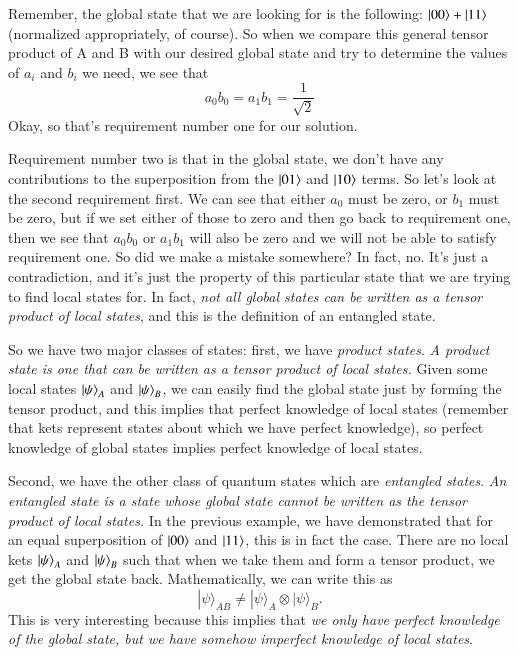 Remember, the global state that we are looking for is the following: $\ket{00}+\ket{11}$ (normalized appropriately, of course). 
So when we compare this general tensor product of A and B with our desired global state and try to determine the values of $a_i$ and $b_i$ we need, we see that
\begin{equation}
a_{0} b_{0}=a_{1} b_{1}=\frac{1}{\sqrt{2}}
\end{equation}
Okay, so that's requirement number one for our solution.

Requirement number two is that in the global state, we don't have any contributions to the superposition from the $\ket{01}$ and $\ket{10}$ terms. So let's look at the second requirement first. We can see that either $a_0$ must be zero, or $b_1$ must be zero, but if we set either of those to zero and then go back to requirement one, then we see that $a_0 b_0$ or $a_1 b_1$ will also be zero and we will not be able to satisfy requirement one.
So did we make a mistake somewhere? In fact, no. It's just a contradiction, and it's just the property of this particular state that we are trying to find local states for. In fact, \emph{not all global states can be written as a tensor product of local states}, and this is the definition of an entangled state.

So we have two major classes of states: first, we have \emph{product states}. %
\emph{A product state is one that can be written as a tensor product of local states.} Given some local states $\ket{\psi}_A$ and $\ket{\psi}_B$, we can easily find the global state just by forming the tensor product, and this implies that perfect knowledge of local states (remember that kets represent states about which we have perfect knowledge), so perfect knowledge of global states implies perfect knowledge of local states.

Second, we have the other class of quantum states which are \emph{entangled states}. \emph{An entangled state is a state whose global state cannot be written as the tensor product of local states.} In the previous example, we have demonstrated that for an equal superposition of $\ket{00}$ and $\ket{11}$, this is in fact the case. There are no local kets $\ket{\psi}_A$ and $\ket{\psi}_B$ such that when we take them and form a tensor product, we get the global state back. Mathematically, we can write this as
\begin{equation}
|\psi\rangle_{A B} \neq|\psi\rangle_{A} \otimes|\psi\rangle_{B}.
\end{equation}
This is very interesting because this implies that \emph{we only have perfect knowledge of the global state, but we have somehow imperfect knowledge of local states}.

